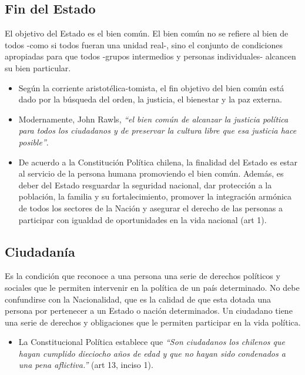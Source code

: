 \documentclass{templateApunte}
\begin{document}
\subsection{Fin del Estado}
El objetivo del Estado es el bien común. El bien común no se refiere al bien de todos -como si todos fueran una unidad real-, sino el conjunto de condiciones apropiadas para que todos -grupos intermedios y personas individuales- alcancen su bien particular.
\begin{itemize}
  \item Según la corriente aristotélica-tomista, el fin objetivo del bien común est\'a dado por la búsqueda del orden, la justicia, el bienestar y la paz externa.
  \item Modernamente, John Rawls, \textit{``el bien común de alcanzar la justicia política para todos los ciudadanos y de preservar la cultura libre que esa justicia hace posible''}.
  \newpage
  \item De acuerdo a la Constitución Política chilena, la finalidad del Estado es estar al servicio de la persona humana promoviendo el bien común. Además, es deber del Estado resguardar la seguridad nacional, dar protección a la población, la familia y su fortalecimiento, promover la integración armónica de todos los sectores de la Nación y asegurar el derecho de las personas a participar con igualdad de oportunidades en la vida nacional (art 1).
\end{itemize}

\subsection{Ciudadanía}
Es la condición que reconoce a una persona una serie de derechos políticos y sociales que le permiten intervenir en la política de un país determinado. No debe confundirse con la Nacionalidad, que es la calidad de que esta dotada una persona por pertenecer a un Estado o nación determinados.
Un ciudadano tiene una serie de derechos y obligaciones que le permiten participar en la vida política.
\begin{itemize}
  \item La Constitucional Política establece que \textit{``Son ciudadanos los chilenos que hayan cumplido dieciocho años de edad y que no hayan sido condenados a una pena aflictiva.''} (art 13, inciso 1).
\end{itemize}
\end{document}
